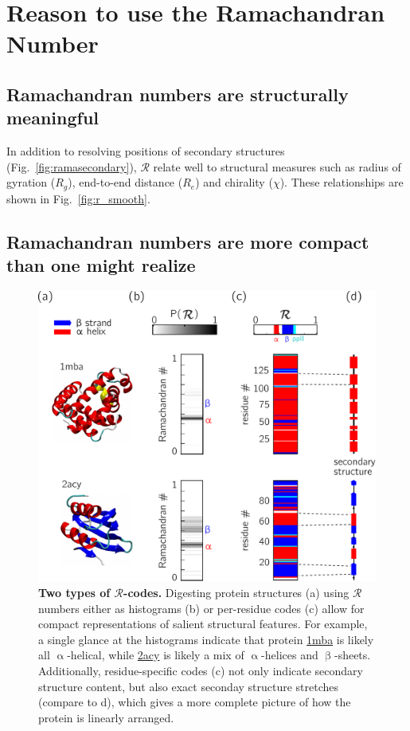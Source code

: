 \documentclass[fleqn,10pt,lineno]{wlpeerj} %
\newcommand{\Fig}[1]{Fig.~\ref{#1}}
\newcommand{\rr}{$\mathcal{R}$\xspace}
\begin{document}
\section*{Reason to use the Ramachandran Number}

\subsection*{Ramachandran numbers are structurally meaningful}
In addition to resolving positions of secondary structures (\Fig{fig:ramasecondary}), \rr relate well to structural measures such as radius of gyration ($R_g$), end-to-end distance ($R_e$) and chirality ($\chi$). These relationships are shown in \Fig{fig:r_smooth}. 

\subsection*{Ramachandran numbers are more compact than one might realize}

\begin{figure}[t!]
\centering
\includegraphics[width=0.65\linewidth]{figures/fig2_metrics.pdf}
\caption{\textbf{Two types of $\mathcal{R}$-codes.} Digesting protein structures (a) using $\mathcal{R}$ numbers either as histograms (b) or per-residue codes (c) allow for compact representations of salient structural features. For example, a single glance at the histograms indicate that protein \href{https://www.rcsb.org/structure/1MBA}{1mba} is likely all $\upalpha$-helical, while \href{https://www.rcsb.org/structure/2ACY}{2acy} is likely a mix of $\upalpha$-helices and $\upbeta$-sheets. Additionally, residue-specific codes (c) not only indicate secondary structure content, but also exact seconday structure stretches (compare to d), which gives a more complete picture of how the protein is linearly arranged. \label{fig:simple_stacks}} 
\end{figure}
\end{document}
